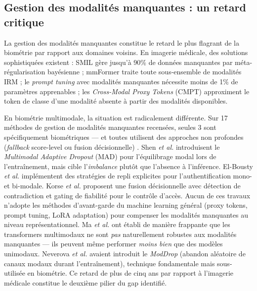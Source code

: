 \documentclass[12pt,a4paper]{report}
\begin{document}
\subsection{Gestion des modalit\'{e}s manquantes : un retard critique}

La gestion des modalit\'{e}s manquantes constitue le retard le plus flagrant de la biom\'{e}trie par rapport aux domaines voisins. En imagerie m\'{e}dicale, des solutions sophistiqu\'{e}es existent : SMIL \cite{ma2021smil} g\`{e}re jusqu'\`{a} 90\% de donn\'{e}es manquantes par m\'{e}ta-r\'{e}gularisation bay\'{e}sienne ; mmFormer \cite{zhang2022mmformer} traite toute sous-ensemble de modalit\'{e}s IRM ; le \textit{prompt tuning} avec modalit\'{e}s manquantes \cite{lee2023multimodal} n\'{e}cessite moins de 1\% de param\`{e}tres apprenables ; les \textit{Cross-Modal Proxy Tokens} (CMPT) \cite{reza2025cmpt} approximent le token de classe d'une modalit\'{e} absente \`{a} partir des modalit\'{e}s disponibles.

En biom\'{e}trie multimodale, la situation est radicalement diff\'{e}rente. Sur 17 m\'{e}thodes de gestion de modalit\'{e}s manquantes recens\'{e}es, seules 3 sont sp\'{e}cifiquement biom\'{e}triques --- et toutes utilisent des approches non profondes (\textit{fallback} score-level ou fusion d\'{e}cisionnelle) \cite{shen2025energy, elbousty2025multimodal, korse2026context}. Shen \textit{et al.} \cite{shen2025energy} introduisent le \textit{Multimodal Adaptive Dropout} (MAD) pour l'\'{e}quilibrage modal lors de l'entra\^{i}nement, mais cible l'\textit{imbalance} plut\^{o}t que l'absence \`{a} l'inf\'{e}rence. El-Bousty \textit{et al.} \cite{elbousty2025multimodal} impl\'{e}mentent des strat\'{e}gies de repli explicites pour l'authentification mono- et bi-modale. Korse \textit{et al.} \cite{korse2026context} proposent une fusion d\'{e}cisionnelle avec d\'{e}tection de contradiction et gating de fiabilit\'{e} pour le contr\^{o}le d'acc\`{e}s. Aucun de ces travaux n'adopte les m\'{e}thodes d'avant-garde du machine learning g\'{e}n\'{e}ral (proxy tokens, prompt tuning, LoRA adaptation) pour compenser les modalit\'{e}s manquantes au niveau repr\'{e}sentationnel. Ma \textit{et al.} \cite{ma2022multimodal} ont \'{e}tabli de mani\`{e}re frappante que les transformers multimodaux ne sont \textit{pas} naturellement robustes aux modalit\'{e}s manquantes --- ils peuvent m\^{e}me performer \textit{moins bien} que des mod\`{e}les unimodaux. Neverova \textit{et al.} \cite{neverova2016moddrop} avaient introduit le \textit{ModDrop} (abandon al\'{e}atoire de canaux modaux durant l'entra\^{i}nement), technique fondamentale mais sous-utilis\'{e}e en biom\'{e}trie. Ce retard de plus de cinq ans par rapport \`{a} l'imagerie m\'{e}dicale constitue le deuxi\`{e}me pilier du gap identifi\'{e}.
\end{document}
